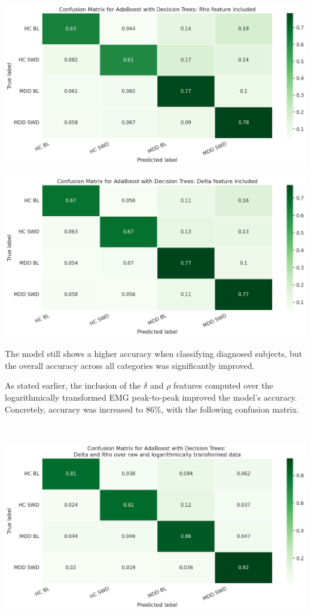 \documentclass{article}
\begin{document}
\includegraphics[scale=0.24]{cm-rho}
\raggedright
\includegraphics[scale=0.24]{cm-delta}



\justifying
\begin{multicols}{2}

The model still shows a higher accuracy when classifying diagnosed subjects, but
the overall accuracy across all categories was significantly improved.

As stated earlier, the inclusion of the $\delta$ and $\rho$ features computed
over the logarithmically transformed EMG peak-to-peak improved the model's
accuracy. Concretely, accuracy was increased to $86\%$, with the following
confusion matrix.

\end{multicols}

~
\centering

\includegraphics[scale=0.4]{cm-dr-ln}
\end{document}
